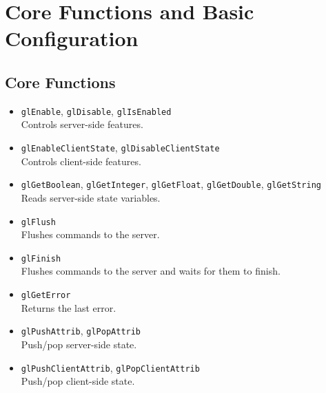 \documentclass[12pt]{article}
\begin{document}
\tableofcontents





\section{Core Functions and Basic Configuration}



\subsection{Core Functions}
\begin{itemize}
\item \texttt{glEnable}, \texttt{glDisable}, \texttt{glIsEnabled} \\
	Controls server-side features.
\item \texttt{glEnableClientState}, \texttt{glDisableClientState} \\
	Controls client-side features.
\item \texttt{glGetBoolean}, \texttt{glGetInteger}, \texttt{glGetFloat}, \texttt{glGetDouble}, \texttt{glGetString} \\
	Reads server-side state variables.
\item \texttt{glFlush} \\
	Flushes commands to the server.
\item \texttt{glFinish} \\
	Flushes commands to the server and waits for them to finish.
\item \texttt{glGetError} \\
	Returns the last error.
\item \texttt{glPushAttrib}, \texttt{glPopAttrib} \\
	Push/pop server-side state.
\item \texttt{glPushClientAttrib}, \texttt{glPopClientAttrib} \\
	Push/pop client-side state.
\end{itemize}
\end{document}
